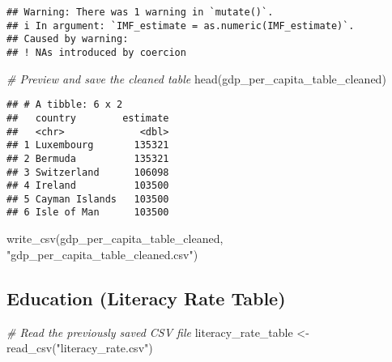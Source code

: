 \documentclass[
]{article}
\newenvironment{Shaded}{\begin{snugshade}}{\end{snugshade}}
\newcommand{\CommentTok}[1]{\textcolor[rgb]{0.56,0.35,0.01}{\textit{#1}}}
\newcommand{\FunctionTok}[1]{\textcolor[rgb]{0.00,0.00,0.00}{#1}}
\newcommand{\NormalTok}[1]{#1}
\newcommand{\OtherTok}[1]{\textcolor[rgb]{0.56,0.35,0.01}{#1}}
\newcommand{\StringTok}[1]{\textcolor[rgb]{0.31,0.60,0.02}{#1}}
\begin{document}
\begin{verbatim}
## Warning: There was 1 warning in `mutate()`.
## i In argument: `IMF_estimate = as.numeric(IMF_estimate)`.
## Caused by warning:
## ! NAs introduced by coercion
\end{verbatim}

\begin{Shaded}
\begin{Highlighting}[]
\CommentTok{\# Preview and save the cleaned table}
\FunctionTok{head}\NormalTok{(gdp\_per\_capita\_table\_cleaned) }
\end{Highlighting}
\end{Shaded}

\begin{verbatim}
## # A tibble: 6 x 2
##   country        estimate
##   <chr>             <dbl>
## 1 Luxembourg       135321
## 2 Bermuda          135321
## 3 Switzerland      106098
## 4 Ireland          103500
## 5 Cayman Islands   103500
## 6 Isle of Man      103500
\end{verbatim}

\begin{Shaded}
\begin{Highlighting}[]
\FunctionTok{write\_csv}\NormalTok{(gdp\_per\_capita\_table\_cleaned, }\StringTok{"gdp\_per\_capita\_table\_cleaned.csv"}\NormalTok{)}
\end{Highlighting}
\end{Shaded}

\hypertarget{education-literacy-rate-table}{%
\subsection{Education (Literacy Rate
Table)}\label{education-literacy-rate-table}}

\begin{Shaded}
\begin{Highlighting}[]
\CommentTok{\# Read the previously saved CSV file}
\NormalTok{literacy\_rate\_table }\OtherTok{\textless{}{-}} \FunctionTok{read\_csv}\NormalTok{(}\StringTok{"literacy\_rate.csv"}\NormalTok{)}
\end{Highlighting}
\end{Shaded}
\end{document}
